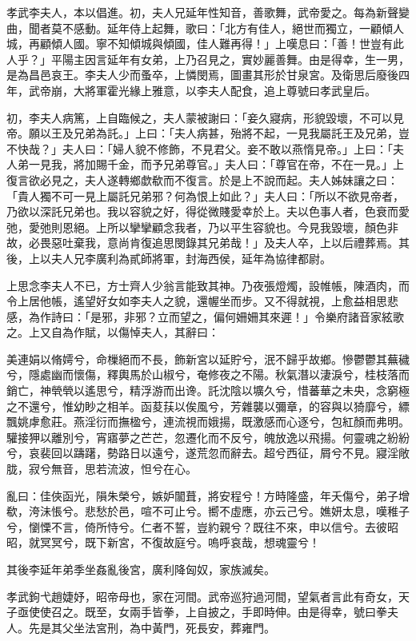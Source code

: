 \begin{pinyinscope}
孝武李夫人，本以倡進。初，夫人兄延年性知音，善歌舞，武帝愛之。每為新聲變曲，聞者莫不感動。延年侍上起舞，歌曰：「北方有佳人，絕世而獨立，一顧傾人城，再顧傾人國。寧不知傾城與傾國，佳人難再得！」上嘆息曰：「善！世豈有此人乎？」平陽主因言延年有女弟，上乃召見之，實妙麗善舞。由是得幸，生一男，是為昌邑哀王。李夫人少而蚤卒，上憐閔焉，圖畫其形於甘泉宮。及衛思后廢後四年，武帝崩，大將軍霍光緣上雅意，以李夫人配食，追上尊號曰孝武皇后。

初，李夫人病篤，上自臨候之，夫人蒙被謝曰：「妾久寢病，形貌毀壞，不可以見帝。願以王及兄弟為託。」上曰：「夫人病甚，殆將不起，一見我屬託王及兄弟，豈不快哉？」夫人曰：「婦人貌不修飾，不見君父。妾不敢以燕惰見帝。」上曰：「夫人弟一見我，將加賜千金，而予兄弟尊官。」夫人曰：「尊官在帝，不在一見。」上復言欲必見之，夫人遂轉鄉歔欷而不復言。於是上不說而起。夫人姊妹讓之曰：「貴人獨不可一見上屬託兄弟邪？何為恨上如此？」夫人曰：「所以不欲見帝者，乃欲以深託兄弟也。我以容貌之好，得從微賤愛幸於上。夫以色事人者，色衰而愛弛，愛弛則恩絕。上所以攣攣顧念我者，乃以平生容貌也。今見我毀壞，顏色非故，必畏惡吐棄我，意尚肯復追思閔錄其兄弟哉！」及夫人卒，上以后禮葬焉。其後，上以夫人兄李廣利為貳師將軍，封海西侯，延年為協律都尉。

上思念李夫人不已，方士齊人少翁言能致其神。乃夜張燈燭，設帷帳，陳酒肉，而令上居他帳，遙望好女如李夫人之貌，還幄坐而步。又不得就視，上愈益相思悲感，為作詩曰：「是邪，非邪？立而望之，偏何姍姍其來遲！」令樂府諸音家絃歌之。上又自為作賦，以傷悼夫人，其辭曰：

美連娟以脩嫮兮，命樔絕而不長，飾新宮以延貯兮，泯不歸乎故鄉。慘鬱鬱其蕪穢兮，隱處幽而懷傷，釋輿馬於山椒兮，奄修夜之不陽。秋氣潛以淒淚兮，桂枝落而銷亡，神煢煢以遙思兮，精浮游而出谗。託沈陰以壙久兮，惜蕃華之未央，念窮極之不還兮，惟幼眇之相羊。函荾荴以俟風兮，芳雜襲以彌章，的容與以猗靡兮，縹飄姚虖愈莊。燕淫衍而撫楹兮，連流視而娥揚，既激感而心逐兮，包紅顏而弗明。驩接狎以離別兮，宵寤夢之芒芒，忽遷化而不反兮，魄放逸以飛揚。何靈魂之紛紛兮，哀裴回以躊躇，勢路日以遠兮，遂荒忽而辭去。超兮西征，屑兮不見。寢淫敞胧，寂兮無音，思若流波，怛兮在心。

亂曰：佳俠函光，隕朱榮兮，嫉妒闟葺，將安程兮！方時隆盛，年夭傷兮，弟子增欷，洿沬悵兮。悲愁於邑，喧不可止兮。嚮不虛應，亦云己兮。嫶妍太息，嘆稚子兮，懰慄不言，倚所恃兮。仁者不誓，豈約親兮？既往不來，申以信兮。去彼昭昭，就冥冥兮，既下新宮，不復故庭兮。嗚呼哀哉，想魂靈兮！

其後李延年弟季坐姦亂後宮，廣利降匈奴，家族滅矣。

孝武鉤弋趙婕妤，昭帝母也，家在河間。武帝巡狩過河間，望氣者言此有奇女，天子亟使使召之。既至，女兩手皆拳，上自披之，手即時伸。由是得幸，號曰拳夫人。先是其父坐法宮刑，為中黃門，死長安，葬雍門。


\end{pinyinscope}
